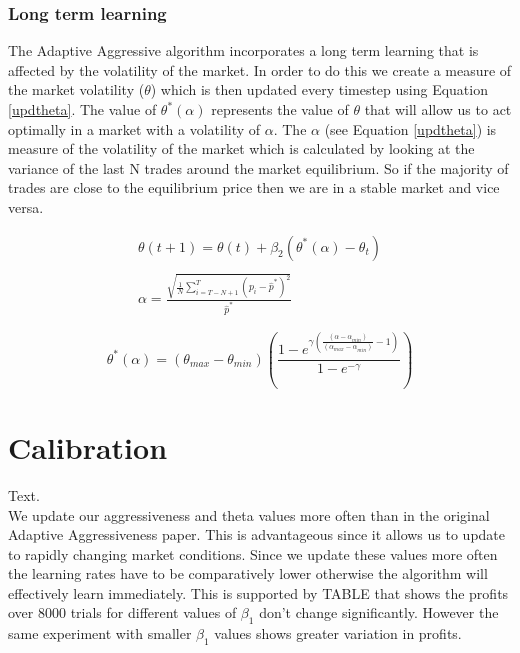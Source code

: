 \documentclass{acm_proc_article-sp}
\begin{document}
\subsubsection{Long term learning} \label{sec:AA_long_term_learning}
The Adaptive Aggressive algorithm incorporates a long term learning that is
affected by the volatility of the market. In order to do this we create a
measure of the market volatility ($\theta$) which is then updated every
timestep using Equation \ref{updtheta}. The value of $\theta^*(\alpha)$
represents the value of $\theta$ that will allow us to act optimally in a
market with a volatility of $\alpha$.  The $\alpha$ (see Equation
\ref{updtheta}) is measure of the volatility of the market which is calculated
by looking at the variance of the last N trades around the market equilibrium.
So if the majority of trades are close to the equilibrium price then we are in
a stable market and vice versa.

\begin{equation}
\label{updtheta}
\begin{split}
\theta(t+1)=\theta(t)+\beta_2(\theta^*(\alpha)-\theta_t)\\\\
\alpha = \frac{\sqrt{\frac 1 N \sum^T_{i=T-N+1}(p_i-\hat p^*)^2}}{\hat p^*}
\end{split}
\end{equation}

\begin{equation}
\theta^*(\alpha) = (\theta_{max}-\theta_{min})
\left(\frac{1-e^{\gamma\left(\frac{(\alpha-\alpha_{min})}{(\alpha_{max}
-\alpha_{min})}-1\right)}}{1-e^{-\gamma}}\right)
\label{thetastar}
\end{equation}

\section{Calibration} \label{sec:calibration}
Text.\\

We update our aggressiveness and theta values more often than in the original Adaptive Aggressiveness paper\cite{AA_thesis}. This is advantageous since it allows us to update to rapidly changing market conditions. Since we update these values more often the learning rates have to be comparatively lower otherwise the algorithm will effectively learn immediately. This is supported by TABLE that shows the profits over 8000 trials for different values of $\beta_1$ don't change significantly. However the same experiment with smaller $\beta_1$ values shows greater variation in profits.
\end{document}
